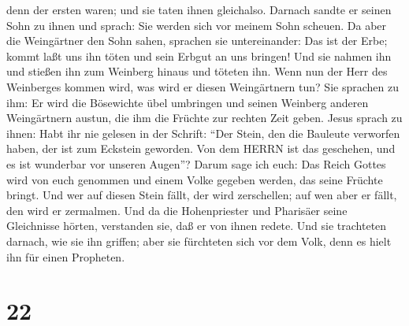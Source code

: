 denn der ersten waren; und sie taten ihnen gleichalso. 
Darnach sandte er seinen Sohn zu ihnen und sprach: Sie werden sich vor
meinem Sohn scheuen.  Da aber die Weingärtner den Sohn
sahen, sprachen sie untereinander: Das ist der Erbe; kommt laßt uns ihn
töten und sein Erbgut an uns bringen!  Und sie nahmen ihn
und stießen ihn zum Weinberg hinaus und töteten ihn.  Wenn
nun der Herr des Weinberges kommen wird, was wird er diesen Weingärtnern
tun?  Sie sprachen zu ihm: Er wird die Bösewichte übel
umbringen und seinen Weinberg anderen Weingärtnern austun, die ihm die
Früchte zur rechten Zeit geben.  Jesus sprach zu ihnen:
Habt ihr nie gelesen in der Schrift: ``Der Stein, den die Bauleute
verworfen haben, der ist zum Eckstein geworden. Von dem HERRN ist das
geschehen, und es ist wunderbar vor unseren Augen''?  Darum
sage ich euch: Das Reich Gottes wird von euch genommen und einem Volke
gegeben werden, das seine Früchte bringt.  Und wer auf
diesen Stein fällt, der wird zerschellen; auf wen aber er fällt, den
wird er zermalmen.  Und da die Hohenpriester und Pharisäer
seine Gleichnisse hörten, verstanden sie, daß er von ihnen redete.
 Und sie trachteten darnach, wie sie ihn griffen; aber sie
fürchteten sich vor dem Volk, denn es hielt ihn für einen Propheten.

\hypertarget{section-21}{%
\section{22}\label{section-21}}

